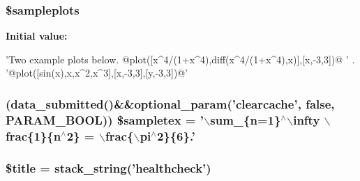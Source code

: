 \label{healthcheck_8php_ad8590b7afabc52a690a1e8e5859f3155}
\hypertarget{healthcheck_8php_a7f52428d8b09f3246672a650e29dbe13}{
\subsubsection[{\$sampleplots}]{\setlength{\rightskip}{0pt plus 5cm}\$sampleplots}}
\label{healthcheck_8php_a7f52428d8b09f3246672a650e29dbe13}
{\bfseries Initial value:}
\begin{DoxyCode}
 'Two example plots below.  @plot([x^4/(1+x^4),diff(x^4/(1+x^4),x)],[x,-3,3])@  '
       .
        '@plot([sin(x),x,x^2,x^3],[x,-3,3],[y,-3,3])@'
\end{DoxyCode}
\hypertarget{healthcheck_8php_a0bf3c4d1490f0f3f572155c665b3a132}{
\subsubsection[{\$sampletex}]{ (data\_\-submitted()\&\&optional\_\-param('clearcache', false, PARAM\_\-BOOL)) \$sampletex = '$\backslash$sum\_\-\{n=1\}$^\wedge$$\backslash$infty $\backslash$frac\{1\}\{n$^\wedge$2\} = $\backslash$frac\{$\backslash$pi$^\wedge$2\}\{6\}.'}}
\label{healthcheck_8php_a0bf3c4d1490f0f3f572155c665b3a132}
\hypertarget{healthcheck_8php_ada57e7bb7c152edad18fe2f166188691}{
\subsubsection[{\$title}]{\setlength{\rightskip}{0pt plus 5cm}\$title = stack\_\-string('healthcheck')}}
\label{healthcheck_8php_ada57e7bb7c152edad18fe2f166188691}
